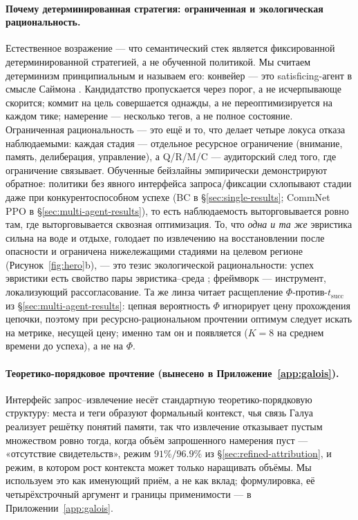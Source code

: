 \documentclass{article}
\begin{document}
\paragraph{Почему детерминированная стратегия: ограниченная и экологическая рациональность.}
Естественное возражение --- что семантический стек является фиксированной детерминированной стратегией, а не обученной политикой. Мы считаем детерминизм принципиальным и называем его: конвейер --- это satisficing-агент в смысле Саймона \citep{simon1955behavioral,simon1956rational}. Кандидатство пропускается через порог, а не исчерпывающе скорится; коммит на цель совершается однажды, а не переоптимизируется на каждом тике; намерение --- несколько тегов, а не полное состояние. Ограниченная рациональность --- это ещё и то, что делает четыре локуса отказа наблюдаемыми: каждая стадия --- отдельное ресурсное ограничение (внимание, память, делиберация, управление), а Q/R/M/C --- аудиторский след того, где ограничение связывает. Обученные бейзлайны эмпирически демонстрируют обратное: политики без явного интерфейса запроса/фиксации схлопывают стадии даже при конкурентоспособном успехе (BC в \S\ref{sec:single-results}; CommNet PPO в \S\ref{sec:multi-agent-results}), то есть наблюдаемость выторговывается ровно там, где выторговывается сквозная оптимизация. То, что \emph{одна и та же} эвристика сильна на воде и отдыхе, голодает по извлечению на восстановлении после опасности и ограничена нижележащими стадиями на целевом регионе (Рисунок~\ref{fig:hero}b), --- это тезис экологической рациональности: успех эвристики есть свойство пары эвристика--среда \citep{simon1956rational,gigerenzer1996reasoning}; фреймворк --- инструмент, локализующий рассогласование. Та же линза читает расщепление $\Phi$-против-$t_{\mathrm{succ}}$ из \S\ref{sec:multi-agent-results}: цепная вероятность $\Phi$ игнорирует цену прохождения цепочки, поэтому при ресурсно-рациональном прочтении \citep{lieder2020resource} оптимум следует искать на метрике, несущей цену; именно там он и появляется ($K{=}8$ на среднем времени до успеха), а не на $\Phi$.

\paragraph{Теоретико-порядковое прочтение (вынесено в Приложение~\ref{app:galois}).}
Интерфейс запрос--извлечение несёт стандартную теоретико-порядковую структуру: места и теги образуют формальный контекст, чья связь Галуа реализует решётку понятий памяти, так что извлечение отказывает пустым множеством ровно тогда, когда объём запрошенного намерения пуст --- «отсутствие свидетельств», режим $91\%/96.9\%$ из \S\ref{sec:refined-attribution}, и режим, в котором рост контекста может только наращивать объёмы. Мы используем это как именующий приём, а не как вклад; формулировка, её четырёхстрочный аргумент и границы применимости --- в Приложении~\ref{app:galois}.
\end{document}
